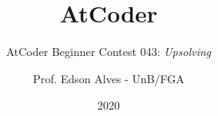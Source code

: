 \title{AtCoder}
\subtitle{AtCoder Beginner Contest 043: {\it Upsolving}}
\author{Prof. Edson Alves - UnB/FGA}
\date{2020}

